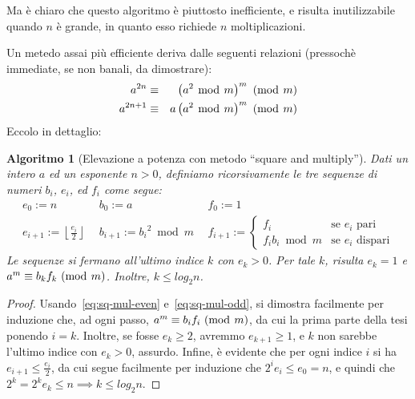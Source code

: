 \documentclass[pdflatex,11pt,a4paper,oneside]{article}
\newcommand{\p}[1]{\left({#1}\right)}
\newcommand{\floor}[1]{\left\lfloor{#1}\right\rfloor}
\newcommand{\congruent}[0]{\equiv}
\newcommand{\mmodop}[0]{\ensuremath{\operatorname{mod}}}
\newcommand{\mmod}[1]{\ensuremath{\allowbreak\ (\mmodop\:{#1})}}
\newcommand{\rem}[2]{\ensuremath{{#1}\:\mmodop\:{#2}}}
\newtheorem{algorithm}[TheoremLike]{Algoritmo}
\begin{document}
Ma \`e chiaro che questo algoritmo \`e piuttosto inefficiente, e risulta
inutilizzabile quando $n$ \`e grande, in quanto esso richiede $n$
moltiplicazioni.

Un metedo assai pi\`u efficiente deriva dalle seguenti relazioni
(pressoch\`e immediate, se non banali, da dimostrare):
\begin{eqnarray}
  a^{2n}   & \congruent & \p{\rem{a^2}{m}}^m \mmod m
    \label{eq:sq-mul-even}
  \\
  a^{2n+1} & \congruent & a \p{\rem{a^2}{m}}^m \mmod m
    \label{eq:sq-mul-odd}
\end{eqnarray}
%
Eccolo in dettaglio:
\begin{algorithm}[Elevazione a potenza con metodo ``square and multiply'']
Dati un intero $a$ ed un esponente $n > 0$, definiamo ricorsivamente le
tre sequenze di numeri $b_i$, $e_i$, ed $f_i$ come segue:
\begin{displaymath}
  \begin{array}{lll}
    e_0 := n &
    b_0 := a &
    f_0 := 1
  \\
    e_{i+1} := \floor{\frac{e_i}{2}} ~~ &
    b_{i+1} := \rem{{b_i}^2}{m} ~~ &
    f_{i+1} := \begin{cases}
             f_i & \text{se $e_i$ pari} \\
             \rem{f_i b_i}{m} & \text{se $e_i$ dispari}
           \end{cases}
  \end{array}
\end{displaymath}
Le sequenze si fermano all'ultimo indice $k$ con $e_k > 0$.  Per tale
$k$, risulta $e_k = 1$ e $a^m \congruent b_k f_k \mmod m$.  Inoltre,
$k \leq log_2 n$.
\end{algorithm}

\begin{proof}
Usando~\eqref{eq:sq-mul-even} e~\eqref{eq:sq-mul-odd}, si dimostra
facilmente per induzione che, ad ogni passo, $a^m \congruent b_i f_i
\mmod m$, da cui la prima parte della tesi ponendo $i = k$.  Inoltre,
se fosse $e_k \geq 2$, avremmo $e_{k+1} \geq 1$, e $k$ non sarebbe
l'ultimo indice con $e_k > 0$, assurdo.  Infine, \`e evidente che
per ogni indice $i$ si ha $e_{i+1} \leq \frac{e_i}{2}$, da cui segue
facilmente per induzione che $2^i e_i \leq e_0 = n$, e quindi che
$2^k = 2^k e_k \leq n \implies k \leq log_2 n$.
\end{proof}

\end{document}

